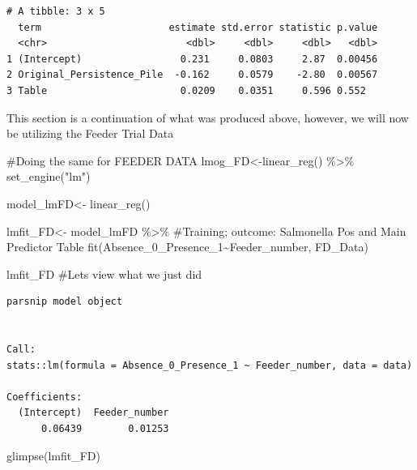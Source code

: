 \documentclass[
  letterpaper,
  DIV=11,
  numbers=noendperiod]{scrartcl}
\newenvironment{Shaded}{}{}
\newcommand{\CommentTok}[1]{\textcolor[rgb]{0.42,0.45,0.49}{#1}}
\newcommand{\FunctionTok}[1]{\textcolor[rgb]{0.44,0.26,0.76}{#1}}
\newcommand{\NormalTok}[1]{\textcolor[rgb]{0.14,0.16,0.18}{#1}}
\newcommand{\OtherTok}[1]{\textcolor[rgb]{0.44,0.26,0.76}{#1}}
\newcommand{\SpecialCharTok}[1]{\textcolor[rgb]{0.00,0.36,0.77}{#1}}
\newcommand{\StringTok}[1]{\textcolor[rgb]{0.01,0.18,0.38}{#1}}
\begin{document}
\begin{verbatim}
# A tibble: 3 x 5
  term                      estimate std.error statistic p.value
  <chr>                        <dbl>     <dbl>     <dbl>   <dbl>
1 (Intercept)                 0.231     0.0803     2.87  0.00456
2 Original_Persistence_Pile  -0.162     0.0579    -2.80  0.00567
3 Table                       0.0209    0.0351     0.596 0.552  
\end{verbatim}

This section is a continuation of what was produced above, however, we
will now be utilizing the Feeder Trial Data

\begin{Shaded}
\begin{Highlighting}[]
\CommentTok{\#Doing the same for FEEDER DATA}
\NormalTok{lmog\_FD}\OtherTok{\textless{}{-}}\FunctionTok{linear\_reg}\NormalTok{() }\SpecialCharTok{\%\textgreater{}\%} 
  \FunctionTok{set\_engine}\NormalTok{(}\StringTok{"lm"}\NormalTok{)}

\NormalTok{model\_lmFD}\OtherTok{\textless{}{-}} \FunctionTok{linear\_reg}\NormalTok{()}

\NormalTok{lmfit\_FD}\OtherTok{\textless{}{-}}\NormalTok{ model\_lmFD }\SpecialCharTok{\%\textgreater{}\%} \CommentTok{\#Training; outcome: Salmonella Pos and Main Predictor Table}
  \FunctionTok{fit}\NormalTok{(Absence\_0\_Presence\_1}\SpecialCharTok{\textasciitilde{}}\NormalTok{Feeder\_number, FD\_Data) }

\NormalTok{lmfit\_FD }\CommentTok{\#Let\textquotesingle{}s view what we just did}
\end{Highlighting}
\end{Shaded}

\begin{verbatim}
parsnip model object


Call:
stats::lm(formula = Absence_0_Presence_1 ~ Feeder_number, data = data)

Coefficients:
  (Intercept)  Feeder_number  
      0.06439        0.01253  
\end{verbatim}

\begin{Shaded}
\begin{Highlighting}[]
\FunctionTok{glimpse}\NormalTok{(lmfit\_FD)}
\end{Highlighting}
\end{Shaded}
\end{document}

